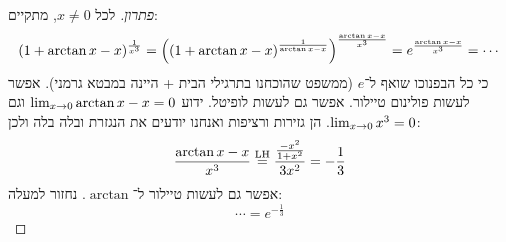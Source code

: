 \documentclass[name=רשימות חשבון דיפרנציאלי ואינטגרלי 1א]{../../../tex/classes/megasumPreamble}
\begin{document}

	\begin{proof}[פתרון]
		לכל $x \neq 0$, מתקיים:
		\[ (1 + \arctan x - x)^{\frac{1}{x^{3}}} = \left ( \left ( 1 + \arctan x - x \right )^{\frac{1}{\arctan x - x}} \right )^{\frac{\arctan x - x}{x^{3}}} = e^{\frac{\arctan x - x}{x^{3}}} = \cdots \]
		כי כל הבפנוכו שואף ל־$e$ (ממשפט שהוכחנו בתרגילי הבית + היינה במבטא גרמני). אפשר לעשות פולינום טיילור. אפשר גם לעשות לופיטל. ידוע $\lim_{x \to 0} \arctan x - x = 0$ וגם $\lim_{x \to 0} x^{3} = 0$. הן גזירות ורציפות ואנחנו יודעים את הנגזרת ובלה בלה ולכן:
		\[ \frac{\arctan x - x}{x^{3}} \overset{\mathrm{LH}}{=} \frac{\frac{-x^{2}}{1 + x^{2}}}{3x^{2}} = -\frac{1}{3} \]
		אפשר גם לעשות טיילור ל־$\arctan$. נחזור למעלה:
		\[ \cdots = e^{-\frac{1}{3}} \]
	\end{proof}

\end{document}
